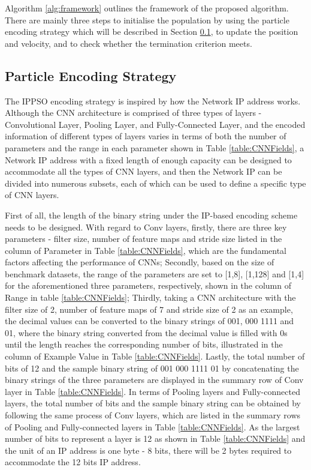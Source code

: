 \documentclass[conference]{IEEEtran}
\begin{document}
Algorithm \ref{alg:framework} outlines the framework of the proposed algorithm. There are mainly three steps to initialise the population by using the particle encoding strategy which will be described in Section \ref{sec:ParticleEncodingStrategy}, to update the position and velocity, and to check whether the termination criterion meets.

\subsection{Particle Encoding Strategy}\label{sec:ParticleEncodingStrategy}

The IPPSO encoding strategy is inspired by how the Network IP address works. Although the CNN architecture is comprised of three types of layers - Convolutional Layer, Pooling Layer, and Fully-Connected Layer, and the encoded information of different types of layers varies in terms of both the number of parameters and the range in each parameter shown in Table \ref{table:CNNFields}, a Network IP address with a fixed length of enough capacity can be designed to accommodate all the types of CNN layers, and then the Network IP can be divided into numerous subsets, each of which can be used to define a specific type of CNN layers.


First of all, the length of the binary string under the IP-based encoding scheme needs to be designed. With regard to Conv layers, firstly, there are three key parameters - filter size, number of feature maps and stride size listed in the column of Parameter in Table \ref{table:CNNFields}, which are the fundamental factors affecting the performance of CNNs; Secondly, based on the size of benchmark datasets, the range of the parameters are set to [1,8], [1,128] and [1,4] for the aforementioned three parameters, respectively, shown in the column of Range in table \ref{table:CNNFields}; Thirdly, taking a CNN architecture with the filter size of 2, number of feature maps of 7 and stride size of 2 as an example, the decimal values can be converted to the binary strings of 001, 000 1111 and 01, where the binary string converted from the decimal value is filled with 0s until the length reaches the corresponding number of bits, illustrated in the column of Example Value in Table \ref{table:CNNFields}. Lastly, the total number of bits of 12 and the sample binary string of 001 000 1111 01 by concatenating the binary strings of the three parameters are displayed in the summary row of Conv layer in Table \ref{table:CNNFields}. In terms of Pooling layers and Fully-connected layers, the total number of bits and the sample binary string can be obtained by following the same process of Conv layers, which are listed in the summary rows of Pooling and Fully-connected layers in Table \ref{table:CNNFields}.  As the largest number of bits to represent a layer is 12 as shown in Table \ref{table:CNNFields} and the unit of an IP address is one byte - 8 bits, there will be 2 bytes required to accommodate the 12 bits IP address.
\end{document}
